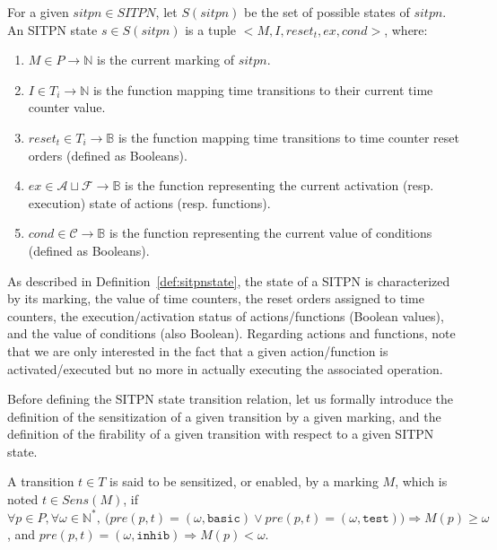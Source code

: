 \begin{definition}
  \label{def:sitpnstate}
  For a given $sitpn\in{}SITPN$, let $S(sitpn)$ be the set of possible
  states of $sitpn$. An SITPN state $s\in{}S(sitpn)$ is a tuple
  ${<}M,I,reset_t,ex,cond{>}$, where:
  \begin{enumerate}
  \item $M\in{}P\rightarrow\mathbb{N}$ is the current marking of
    $sitpn$.
  \item\label{item:sitpn-state-tc} $I\in{}T_i{}\rightarrow\mathbb{N}$
    is the function mapping time transitions to their current time
    counter value.
  \item\label{item:sitpn-state-rst}
    $reset_t\in{}T_i\rightarrow\mathbb{B}$ is the function mapping
    time transitions to time counter reset orders (defined as
    Booleans).
  \item $ex\in{}\mathcal{A}\sqcup\mathcal{F}\rightarrow\mathbb{B}$ is
    the function representing the current activation (resp. execution)
    state of actions (resp. functions).
  \item $cond\in\mathcal{C}\rightarrow\mathbb{B}$ is the function representing the
    current value of conditions (defined as Booleans).
  \end{enumerate}
\end{definition}

As described in Definition~\ref{def:sitpnstate}, the state of a SITPN
is characterized by its marking, the value of time counters, the reset
orders assigned to time counters, the execution/activation status of
actions/functions (Boolean values), and the value of conditions (also
Boolean). Regarding actions and functions, note that we are only
interested in the fact that a given action/function is
activated/executed but no more in actually executing the associated
operation.


Before defining the SITPN state transition relation, let us formally
introduce the definition of the sensitization of a given transition by
a given marking, and the definition of the firability of a given
transition with respect to a given SITPN state.

\begin{definition}[Sensitization]
  \label{def:sens}
  A transition $t\in{}T$ is said to be sensitized, or enabled, by a
  marking $M$, which is noted $t\in{}Sens(M)$, if
  $\forall{}p\in{}P,\forall\omega\in\mathbb{N}^{*},~\big(pre(p,t)=(\omega,\mathtt{basic})\vee{}pre(p,t)=(\omega,\mathtt{test})\big)\Rightarrow{}M(p)\ge{}\omega$,
  and $pre(p,t)=(\omega,\mathtt{inhib})\Rightarrow{}M(p)<{}\omega$.
\end{definition}

